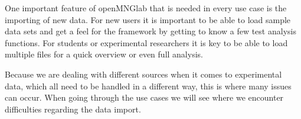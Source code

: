 One important feature of openMNGlab that is needed in every use case is the importing of new data. For new users it is important to be able to load sample data sets and get a feel for the framework by getting to know a few test analysis functions. For students or experimental researchers it is key to be able to load multiple files for a quick overview or even full analysis.

Because we are dealing with different sources when it comes to experimental data, which all need to be handled in a different way, this is where many issues can occur. When going through the use cases we will see where we encounter difficulties regarding the data import.


